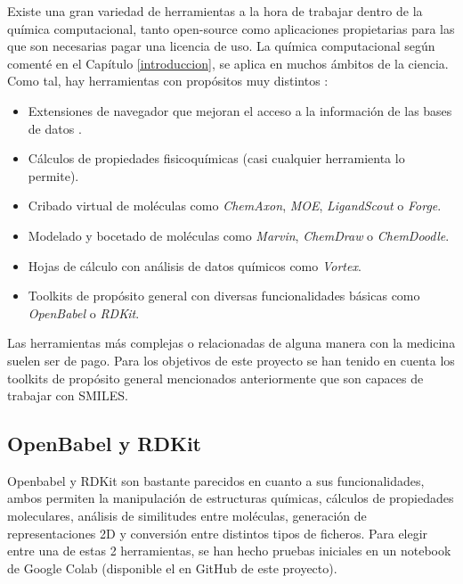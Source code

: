Existe una gran variedad de herramientas a la hora de trabajar dentro de la química computacional, tanto open-source como aplicaciones propietarias para las que son necesarias pagar una licencia de uso. La química computacional según comenté en el Capítulo \ref{introduccion}, se aplica en muchos ámbitos de la ciencia. Como tal, hay herramientas con propósitos muy distintos \cite{toolkits_recap}: 
\begin{itemize}
    \item Extensiones de navegador que mejoran el acceso a la información de las bases de datos \cite{safari_extensions}.
    \item Cálculos de propiedades fisicoquímicas (casi cualquier herramienta lo permite).
    \item Cribado virtual de moléculas como \textit{ChemAxon}, \textit{MOE}, \textit{LigandScout} o \textit{Forge}.
    \item Modelado y bocetado de moléculas como \textit{Marvin}, \textit{ChemDraw} o \textit{ChemDoodle}.
    \item Hojas de cálculo con análisis de datos químicos como \textit{Vortex}.
    \item Toolkits de propósito general con diversas funcionalidades básicas como \textit{OpenBabel} o \textit{RDKit}.
\end{itemize}
Las herramientas más complejas o relacionadas de alguna manera con la medicina suelen ser de pago. Para los objetivos de este proyecto se han tenido en cuenta los toolkits de propósito general mencionados anteriormente que son capaces de trabajar con SMILES.

\subsection{OpenBabel y RDKit}

Openbabel y RDKit son bastante parecidos en cuanto a sus funcionalidades, ambos permiten la manipulación de estructuras químicas, cálculos de propiedades moleculares, análisis de similitudes entre moléculas, generación de representaciones 2D y conversión entre distintos tipos de ficheros. Para elegir entre una de estas 2 herramientas, se han hecho pruebas iniciales en un notebook de Google Colab \cite{google_colab} (disponible el en GitHub de este proyecto).


